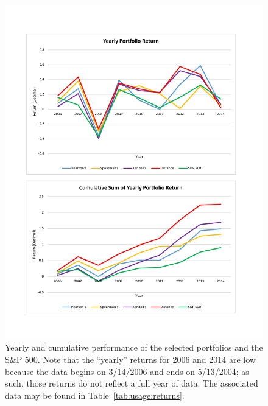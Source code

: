 \begin{figure}[htb]
	\begin{center}
		\includegraphics[width=1\linewidth]
		{ch-usage/figures/Results_YearlyReturns.pdf}
		\caption[Yearly and cumulative performance of the selected portfolios 
		and the S\&P 500.]{Yearly and cumulative performance of the selected 
		portfolios and the S\&P 500. Note that the ``yearly'' returns for 2006 
		and 2014 are low because the data begins on 3/14/2006 and ends on 
		5/13/2004; as such, those returns do not reflect a full year of data. 
		The associated data may be found in Table~\ref{tab:usage:returns}.}
		\label{fig:usage:returns}
	\end{center}
\end{figure}




